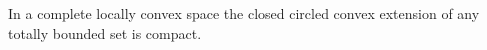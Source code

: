 In a complete locally convex space the closed circled convex extension of any totally bounded set is compact.
